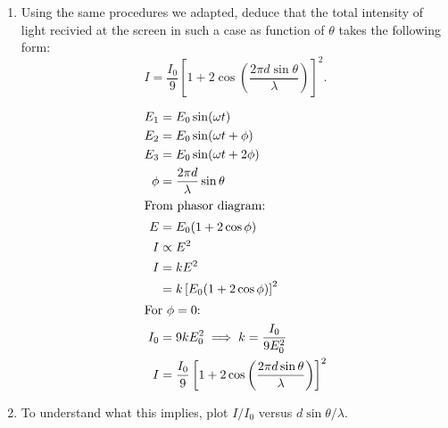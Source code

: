 \documentclass{zc-ust-hw}
\begin{document}
\begin{enumerate}
  \item Using the same procedures we adapted, deduce that the total intensity
    of light recivied at the screen in such a case as function of \(\theta\) takes the
    following form:
    \[
      I=\frac{I_{0}}{9}\left[ 1+2\cos \left(\frac{2\pi d\sin \theta }{\lambda }\right)\right]^2
    .\] 
    \begin{sol}
      \begin{align}
        E_{1}&= E_{0}\sin (\omega t) \\
        E_{2}&= E_{0}\sin (\omega t+\phi ) \\
        E_{3}&= E_{0}\sin (\omega t+2\phi ) \\
        \phi &= \frac{2\pi d}{\lambda }\sin \theta \\
        \intertext{From phasor diagram:}
        E &= E_{0} (1+2\cos \phi ) \\
        I &\propto E^2 \\
        I &= kE^2 \\
          &= k \left[ E_{0} (1+2\cos \phi ) \right]^2 \\
          \intertext{For \( \phi =0 \):}
        I_{0} &= 9kE_{0}^2 \implies k = \frac{I_{0}}{9E_{0}^2} \\
        I&=\frac{I_{0}}{9}\left[ 1+2\cos \left(\frac{2\pi d\sin \theta }{\lambda }\right)\right]^2
      \end{align}
    \end{sol}
  \item To understand what this implies, plot \( I / I_{0} \) versus \( d\sin \theta /\lambda\).
    
    \begin{figure}[htpb]
    \centering
\end{figure}

\end{enumerate}
\end{document}
